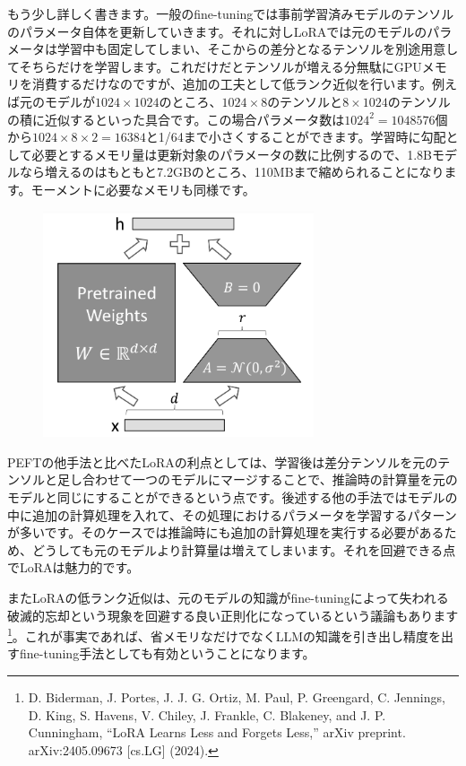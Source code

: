 \documentclass[a5paper,twoside,dvipdfmx]{jsarticle}
\begin{document}
もう少し詳しく書きます。一般のfine-tuningでは事前学習済みモデルのテンソルのパラメータ自体を更新していきます。それに対しLoRAでは元のモデルのパラメータは学習中も固定してしまい、そこからの差分となるテンソルを別途用意してそちらだけを学習します。これだけだとテンソルが増える分無駄にGPUメモリを消費するだけなのですが、追加の工夫として低ランク近似を行います。例えば元のモデルが$1024 \times 1024$のところ、$1024 \times 8$のテンソルと$8 \times 1024$のテンソルの積に近似するといった具合です。この場合パラメータ数は$1024^2 = 1048576$個から$1024 \times 8 \times 2 = 16384$と1/64まで小さくすることができます。学習時に勾配として必要とするメモリ量は更新対象のパラメータの数に比例するので、1.8Bモデルなら増えるのはもともと7.2GBのところ、110MBまで縮められることになります。モーメントに必要なメモリも同様です。

\newpage

\begin{figure}[h]
  \centering
  \includegraphics[width=80mm]{../C105Fig/gray/lora_image.png}
 \end{figure} 

PEFTの他手法と比べたLoRAの利点としては、学習後は差分テンソルを元のテンソルと足し合わせて一つのモデルにマージすることで、推論時の計算量を元のモデルと同じにすることができるという点です。後述する他の手法ではモデルの中に追加の計算処理を入れて、その処理におけるパラメータを学習するパターンが多いです。そのケースでは推論時にも追加の計算処理を実行する必要があるため、どうしても元のモデルより計算量は増えてしまいます。それを回避できる点でLoRAは魅力的です。

またLoRAの低ランク近似は、元のモデルの知識がfine-tuningによって失われる\textsf{破滅的忘却}という現象を回避する良い正則化になっているという議論もあります\footnote{D. Biderman, J. Portes, J. J. G. Ortiz, M. Paul, P. Greengard, C. Jennings, D. King, S. Havens, V. Chiley, J. Frankle, C. Blakeney, and J. P. Cunningham, “LoRA Learns Less and Forgets Less,” arXiv preprint. arXiv:2405.09673 [cs.LG] (2024).}。これが事実であれば、省メモリなだけでなくLLMの知識を引き出し精度を出すfine-tuning手法としても有効ということになります。
\end{document}
